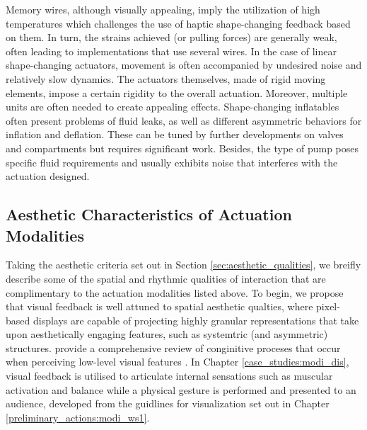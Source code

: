 Memory wires, although visually appealing, imply the utilization of high temperatures which challenges the use of haptic shape-changing feedback based on them. In turn, the strains achieved (or pulling forces) are generally weak, often leading to implementations that use several wires. In the case of linear shape-changing actuators, movement is often accompanied by undesired noise and relatively slow dynamics. The actuators themselves, made of rigid moving elements, impose a certain rigidity to the overall actuation. Moreover, multiple units are often needed to create appealing effects.
Shape-changing inflatables often present problems of fluid leaks, as well as different asymmetric behaviors for inflation and deflation. These can be tuned by further developments on valves and compartments but requires significant work. Besides, the type of pump poses specific fluid requirements and usually exhibits noise that interferes with the actuation designed.

\subsection*{Aesthetic Characteristics of Actuation Modalities}

Taking the aesthetic criteria set out in Section \ref{sec:aesthetic_qualities}, we breifly describe some of the spatial and rhythmic qualities of interaction that are complimentary to the actuation modalities listed above. To begin, we propose that visual feedback is well attuned to spatial aesthetic qualties, where pixel-based displays are capable of projecting highly granular representations that take upon aesthetically engaging features, such as systemtric (and asymmetric) structures. \citeauthor{li_overview_2020} provide a comprehensive review of conginitive proceses that occur when perceiving low-level visual features \cite{li_overview_2020}. In Chapter \ref{case_studies:modi_dis}, visual feedback is utilised to articulate internal sensations such as muscular activation and balance while a physical gesture is performed and presented to an audience, developed from the guidlines for visualization set out in Chapter \ref{preliminary_actions:modi_ws1}.

